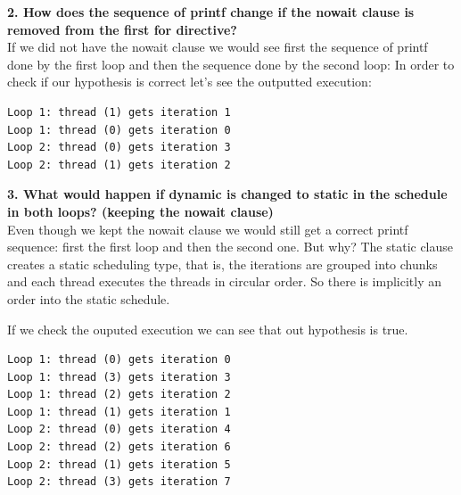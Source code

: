 \documentclass[12]{article}
\begin{document}
\textbf{2. How does the sequence of printf change if the nowait clause is removed from the first for directive?}
\\
If we did not have the nowait clause we would see first the sequence of printf done by the first loop and then the sequence done by the second loop:
In order to check if our hypothesis is correct let's see the outputted execution: 
\\
\begin{lstlisting}[frame=single]
Loop 1: thread (1) gets iteration 1
Loop 1: thread (0) gets iteration 0
Loop 2: thread (0) gets iteration 3
Loop 2: thread (1) gets iteration 2
\end{lstlisting} 
\textbf{3. What would happen if dynamic is changed to static in the schedule in both loops? (keeping the nowait clause)}
\\
 Even though we kept the nowait clause we would still get a correct printf sequence: first the first loop and then the second one. But why? The static clause creates a static scheduling type, that is, the iterations are grouped into chunks and each thread executes the threads in circular order. So there is implicitly an order into the static schedule. 

If we check the ouputed execution we can see that out hypothesis is true. 
\\
\begin{lstlisting}[frame=single]
Loop 1: thread (0) gets iteration 0
Loop 1: thread (3) gets iteration 3
Loop 1: thread (2) gets iteration 2
Loop 1: thread (1) gets iteration 1
Loop 2: thread (0) gets iteration 4
Loop 2: thread (2) gets iteration 6
Loop 2: thread (1) gets iteration 5
Loop 2: thread (3) gets iteration 7
\end{lstlisting}
\end{document}
